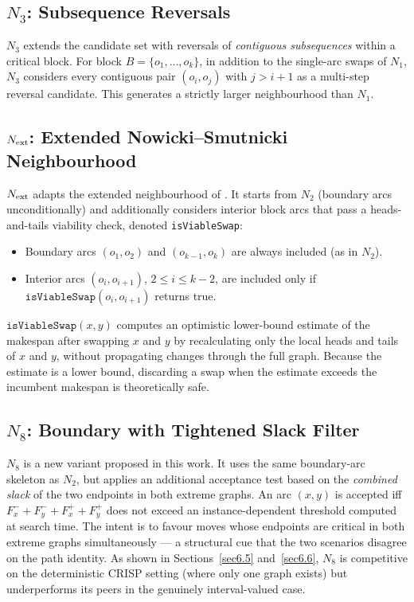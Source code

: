 \documentclass[preprint,12pt]{elsarticle}
\begin{document}
\subsection{$N_3$: Subsequence Reversals}
\label{sec5.3}

$N_3$ extends the candidate set with reversals of \emph{contiguous subsequences} within a critical block. For block $B = \{o_1,\ldots,o_k\}$, in addition to the single-arc swaps of $N_1$, $N_3$ considers every contiguous pair $(o_i, o_j)$ with $j > i+1$ as a multi-step reversal candidate. This generates a strictly larger neighbourhood than $N_1$.

\subsection{$N_{\rm ext}$: Extended Nowicki--Smutnicki Neighbourhood}
\label{sec5.4}

$N_{\rm ext}$ adapts the extended neighbourhood of \cite{Nowicki2005}. It starts from $N_2$ (boundary arcs unconditionally) and additionally considers interior block arcs that pass a heads-and-tails viability check, denoted \texttt{isViableSwap}:
\begin{itemize}
\item Boundary arcs $(o_1,o_2)$ and $(o_{k-1},o_k)$ are always included (as in $N_2$).
\item Interior arcs $(o_i, o_{i+1})$, $2 \leq i \leq k-2$, are included only if $\texttt{isViableSwap}(o_i, o_{i+1})$ returns true.
\end{itemize}
$\texttt{isViableSwap}(x,y)$ computes an optimistic lower-bound estimate of the makespan after swapping $x$ and $y$ by recalculating only the local heads and tails of $x$ and $y$, without propagating changes through the full graph. Because the estimate is a lower bound, discarding a swap when the estimate exceeds the incumbent makespan is theoretically safe.

\subsection{$N_8$: Boundary with Tightened Slack Filter}
\label{sec5.5}

$N_8$ is a new variant proposed in this work. It uses the same boundary-arc skeleton as $N_2$, but applies an additional acceptance test based on the \emph{combined slack} of the two endpoints in both extreme graphs. An arc $(x,y)$ is accepted iff $F_{x}^{-} + F_{y}^{-} + F_{x}^{+} + F_{y}^{+}$ does not exceed an instance-dependent threshold computed at search time. The intent is to favour moves whose endpoints are critical in both extreme graphs simultaneously --- a structural cue that the two scenarios disagree on the path identity. As shown in Sections~\ref{sec6.5} and~\ref{sec6.6}, $N_8$ is competitive on the deterministic CRISP setting (where only one graph exists) but underperforms its peers in the genuinely interval-valued case.
\end{document}

